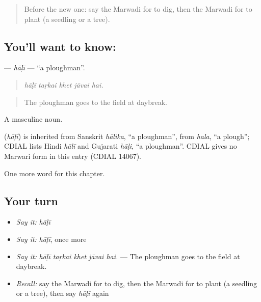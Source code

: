 \label{lesson:MW-C238-hali}



\begin{quote}
Before the new one: say the Marwadi for to dig, then the Marwadi for to plant (a seedling or a tree).
\end{quote}

\subsection*{You'll want to know: }
\textbf{} — \emph{hāḷī} — \textquotedblleft{}a ploughman\textquotedblright{}.

\begin{quote}
    
\end{quote}

\begin{quote}
\emph{hāḷī taṛkai khet jāvai hai.}
\end{quote}

\begin{quote}
The ploughman goes to the field at daybreak.
\end{quote}

A masculine noun.

\begin{cousinweb}
\textbf{} (\emph{hāḷī}) is inherited from Sanskrit \emph{hālika}, \textquotedblleft{}a ploughman\textquotedblright{}, from \emph{hala}, \textquotedblleft{}a plough\textquotedblright{}; CDIAL lists Hindi \emph{hālī} and Gujarati \emph{hāḷi}, \textquotedblleft{}a ploughman\textquotedblright{}. CDIAL gives no Marwari form in this entry (CDIAL 14067).
\end{cousinweb}

\begin{grammarlens}[title={What you've built}]
One more word for this chapter.
\end{grammarlens}

\subsection*{Your turn}
\begin{itemize}
\raggedright
  \item \emph{Say it:} \emph{hāḷī}
  \item \emph{Say it:} \emph{hāḷī}, once more
  \item \emph{Say it:} \emph{hāḷī taṛkai khet jāvai hai.} — The ploughman goes to the field at daybreak.
  \item \emph{Recall:} say the Marwadi for to dig, then the Marwadi for to plant (a seedling or a tree), then say \emph{hāḷī} again
\end{itemize}

